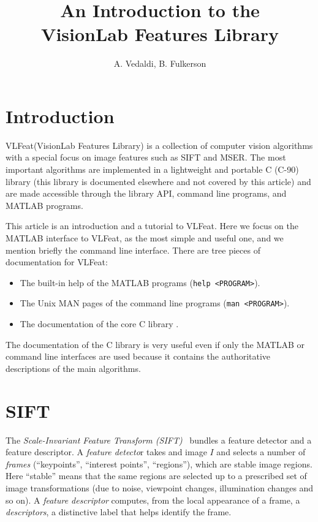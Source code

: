 \documentclass[9.5pt]{article}
\title{An Introduction to the\\ VisionLab Features Library}
\author{A. Vedaldi, B. Fulkerson}
\newcommand{\VLFeat}{{\sc VLFeat}\xspace}
\begin{document}

\ifpdf\twocolumn\fi
\maketitle{}
\ifpdf\tableofcontents{}\fi

\section{Introduction}\label{intro}

\VLFeat (VisionLab Features Library) is a collection of computer
vision algorithms with a special focus on image features such as 
SIFT and MSER. The most important algorithms are implemented
in a lightweight and portable C (C-90) library (this library is documented
elsewhere and not covered by this article) and are made
accessible through the library API, command line programs, and MATLAB programs.

This article is an introduction and a tutorial to
\VLFeat. Here we focus on the MATLAB interface to \VLFeat, as the most simple and useful one, and we mention briefly the command line interface. There are tree pieces of documentation
for \VLFeat:
\begin{itemize}\raggedright
\item The built-in help of the MATLAB programs (\verb$help <PROGRAM>$).
\item The Unix MAN pages of the command line programs (\verb$man <PROGRAM>$).
\item The documentation of the core C library \cite{}.
\end{itemize}
The documentation of the C library is very useful even if only the MATLAB or command line interfaces are used because it contains the authoritative descriptions of the main algorithms.

\section{SIFT}\label{sift}

The {\em Scale-Invariant Feature Transform (SIFT)}~\cite{lowe04distinctive} bundles a feature detector
and a feature descriptor. A {\em feature detecto}r takes and image $I$ and selects a number of {\em frames} (``keypoints'', ``interest points'', ``regions''), which
are stable image regions. Here ``stable'' means that the same regions
are selected up to a prescribed set of image transformations (due to noise, viewpoint changes, illumination changes and so on). A {\em feature
descriptor} computes, from the local appearance of a frame, a {\em
  descriptors}, a distinctive label that helps identify the frame.
\end{document}
